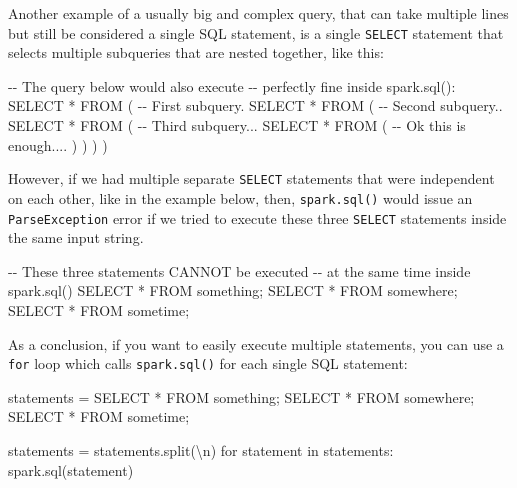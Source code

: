 \documentclass[
  11pt,
  letterpaper,
  DIV=11,
  numbers=noendperiod]{scrreprt}
\newenvironment{Shaded}{\begin{snugshade}}{\end{snugshade}}
\newcommand{\CharTok}[1]{\textcolor[rgb]{0.13,0.47,0.30}{#1}}
\newcommand{\CommentTok}[1]{\textcolor[rgb]{0.37,0.37,0.37}{#1}}
\newcommand{\ControlFlowTok}[1]{\textcolor[rgb]{0.00,0.23,0.31}{#1}}
\newcommand{\KeywordTok}[1]{\textcolor[rgb]{0.00,0.23,0.31}{#1}}
\newcommand{\NormalTok}[1]{\textcolor[rgb]{0.00,0.23,0.31}{#1}}
\newcommand{\OperatorTok}[1]{\textcolor[rgb]{0.37,0.37,0.37}{#1}}
\newcommand{\StringTok}[1]{\textcolor[rgb]{0.13,0.47,0.30}{#1}}
\begin{document}
Another example of a usually big and complex query, that can take
multiple lines but still be considered a single SQL statement, is a
single \texttt{SELECT} statement that selects multiple subqueries that
are nested together, like this:

\begin{Shaded}
\begin{Highlighting}[]
\CommentTok{{-}{-} The query below would also execute}
\CommentTok{{-}{-} perfectly fine inside spark.sql():}
\KeywordTok{SELECT} \OperatorTok{*}
\KeywordTok{FROM}\NormalTok{ (}
  \CommentTok{{-}{-} First subquery.}
  \KeywordTok{SELECT} \OperatorTok{*}
  \KeywordTok{FROM}\NormalTok{ (}
    \CommentTok{{-}{-} Second subquery..}
    \KeywordTok{SELECT} \OperatorTok{*}
    \KeywordTok{FROM}\NormalTok{ (}
      \CommentTok{{-}{-} Third subquery...}
      \KeywordTok{SELECT} \OperatorTok{*}
      \KeywordTok{FROM}\NormalTok{ (}
        \CommentTok{{-}{-} Ok this is enough....}
\NormalTok{      )}
\NormalTok{    )}
\NormalTok{  )}
\NormalTok{)}
\end{Highlighting}
\end{Shaded}

However, if we had multiple separate \texttt{SELECT} statements that
were independent on each other, like in the example below, then,
\texttt{spark.sql()} would issue an \texttt{ParseException} error if we
tried to execute these three \texttt{SELECT} statements inside the same
input string.

\begin{Shaded}
\begin{Highlighting}[]
\CommentTok{{-}{-} These three statements CANNOT be executed}
\CommentTok{{-}{-} at the same time inside spark.sql()}
\KeywordTok{SELECT} \OperatorTok{*} \KeywordTok{FROM}\NormalTok{ something;}
\KeywordTok{SELECT} \OperatorTok{*} \KeywordTok{FROM}\NormalTok{ somewhere;}
\KeywordTok{SELECT} \OperatorTok{*} \KeywordTok{FROM}\NormalTok{ sometime;}
\end{Highlighting}
\end{Shaded}

As a conclusion, if you want to easily execute multiple statements, you
can use a \texttt{for} loop which calls \texttt{spark.sql()} for each
single SQL statement:

\begin{Shaded}
\begin{Highlighting}[]
\NormalTok{statements }\OperatorTok{=} \StringTok{\textquotesingle{}\textquotesingle{}\textquotesingle{}SELECT * FROM something;}
\StringTok{SELECT * FROM somewhere;}
\StringTok{SELECT * FROM sometime;\textquotesingle{}\textquotesingle{}\textquotesingle{}}

\NormalTok{statements }\OperatorTok{=}\NormalTok{ statements.split(}\StringTok{\textquotesingle{}}\CharTok{\textbackslash{}n}\StringTok{\textquotesingle{}}\NormalTok{)}
\ControlFlowTok{for}\NormalTok{ statement }\KeywordTok{in}\NormalTok{ statements:}
\NormalTok{  spark.sql(statement)}
\end{Highlighting}
\end{Shaded}
\end{document}
